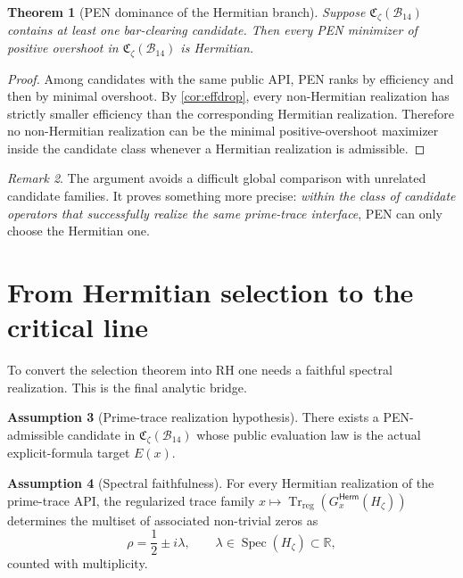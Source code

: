 \documentclass[11pt,a4paper]{article}
\theoremstyle{plain}
\newtheorem{theorem}{Theorem}[section]
\theoremstyle{definition}
\newtheorem{assumption}[theorem]{Assumption}
\theoremstyle{remark}
\newtheorem{remark}[theorem]{Remark}
\newcommand{\R}{\mathbb{R}}
\newcommand{\Bcal}{\mathcal{B}}
\newcommand{\Spec}{\operatorname{Spec}}
\newcommand{\Trreg}{\operatorname{Tr}_{\mathrm{reg}}}
\newcommand{\herm}{\ensuremath{\mathsf{Herm}}}
\begin{document}
\begin{theorem}[PEN dominance of the Hermitian branch]
\label{thm:pendominance}
Suppose $\mathfrak C_{\zeta}(\Bcal_{14})$ contains at least one bar-clearing candidate. Then every PEN minimizer of positive overshoot in $\mathfrak C_{\zeta}(\Bcal_{14})$ is Hermitian.
\end{theorem}

\begin{proof}
Among candidates with the same public API, PEN ranks by efficiency and then by minimal overshoot. By \cref{cor:effdrop}, every non-Hermitian realization has strictly smaller efficiency than the corresponding Hermitian realization. Therefore no non-Hermitian realization can be the minimal positive-overshoot maximizer inside the candidate class whenever a Hermitian realization is admissible.
\end{proof}

\begin{remark}
The argument avoids a difficult global comparison with unrelated candidate families. It proves something more precise: \emph{within the class of candidate operators that successfully realize the same prime-trace interface}, PEN can only choose the Hermitian one.
\end{remark}

\section{From Hermitian selection to the critical line}

To convert the selection theorem into RH one needs a faithful spectral realization. This is the final analytic bridge.

\begin{assumption}[Prime-trace realization hypothesis]
\label{ass:existence}
There exists a PEN-admissible candidate in $\mathfrak C_{\zeta}(\Bcal_{14})$ whose public evaluation law is the actual explicit-formula target $E(x)$.
\end{assumption}

\begin{assumption}[Spectral faithfulness]
\label{ass:faithful}
For every Hermitian realization of the prime-trace API, the regularized trace family $x\mapsto\Trreg(G_x^{\herm}(H_\zeta))$ determines the multiset of associated non-trivial zeros as
\[
\rho = \frac12 \pm i\lambda,
\qquad \lambda\in\Spec(H_\zeta)\subset\R,
\]
counted with multiplicity.
\end{assumption}
\end{document}
